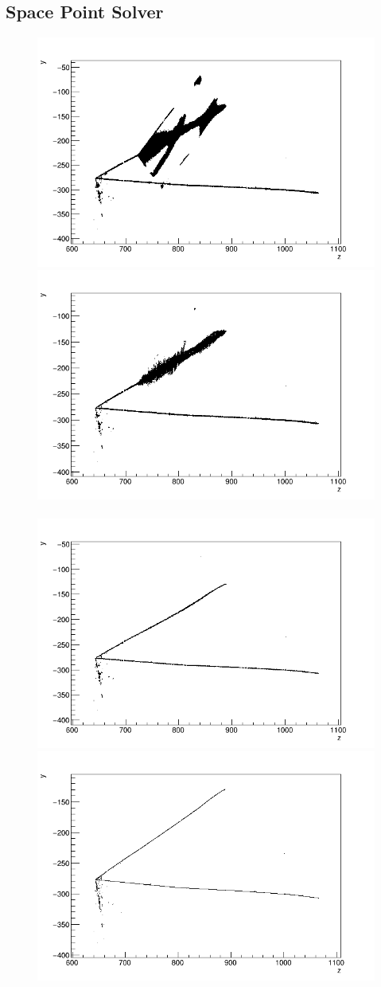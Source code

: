 \subsection{Space Point Solver}

\begin{figure}
\includegraphics[width=.5\linewidth]{graphics/evd_zy_pre_2302}
\includegraphics[width=.5\linewidth]{graphics/evd_zy_noreg_2302}\\
\\
\includegraphics[width=.5\linewidth]{graphics/evd_zy_2302}
\includegraphics[width=.5\linewidth]{graphics/evd_zy_true_2302}
\\


\end{figure}
